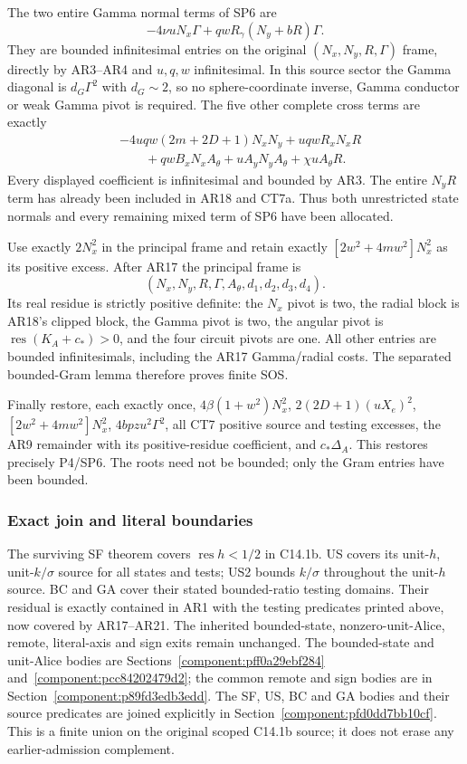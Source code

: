 The two entire Gamma normal terms of SP6 are
\[
 -4\nu uN_x\Gamma
          +qwR_\gamma(N_y+bR)\Gamma.
 \tag{AR19}
\]
They are bounded infinitesimal entries on the original
$(N_x,N_y,R,\Gamma)$ frame, directly by AR3--AR4 and
$u,q,w$ infinitesimal. In this source sector the Gamma diagonal
is $d_G\Gamma^2$ with $d_G\sim2$, so no sphere-coordinate
inverse, Gamma conductor or weak Gamma pivot is required.
The five other complete cross terms are exactly
\[
 \begin{split}
 &-4uqw(2m+2D+1)N_xN_y+uqwR_xN_xR\\
 &\qquad+qwB_xN_xA_\theta+uA_yN_yA_\theta
                                      +\chi uA_\theta R.
 \end{split} \tag{AR20}
\]
Every displayed coefficient is infinitesimal and bounded by
AR3. The entire $N_yR$ term has already been included in
AR18 and CT7a. Thus both unrestricted state normals and every
remaining mixed term of SP6 have been allocated.

Use exactly $2N_x^2$ in the principal frame and retain exactly
$[2w^2+4mw^2]N_x^2$ as its positive excess. After AR17 the
principal frame is
\[
          (N_x,N_y,R,\Gamma,A_\theta,d_1,d_2,d_3,d_4).
 \tag{AR21}
\]
Its real residue is strictly positive definite: the $N_x$ pivot
is two, the radial block is AR18's clipped block, the Gamma
pivot is two, the angular pivot is $\operatorname{res}(K_A+c_*)>0$,
and the four circuit pivots are one. All other entries are
bounded infinitesimals, including the AR17 Gamma/radial costs.
The separated bounded-Gram lemma therefore proves finite SOS.

Finally restore, each exactly once, $4\beta(1+w^2)N_x^2$,
$2(2D+1)(uX_e)^2$, $[2w^2+4mw^2]N_x^2$,
$4bpzu^2\Gamma^2$, all CT7 positive source and testing
excesses, the AR9 remainder with its positive-residue coefficient,
and $c_*\Delta_A$. This restores precisely P4/SP6. The roots
need not be bounded; only the Gram entries have been bounded.

\subsubsection*{Exact join and literal boundaries}

The surviving SF theorem covers $\operatorname{res}h<1/2$ in
C14.1b. US covers its unit-$h$, unit-$k/\sigma$ source for
all states and tests; US2 bounds $k/\sigma$ throughout the
unit-$h$ source. BC and GA cover their stated bounded-ratio
testing domains. Their residual is exactly contained in AR1
with the testing predicates printed above, now covered by
AR17--AR21. The inherited bounded-state, nonzero-unit-Alice,
remote, literal-axis and sign exits remain unchanged. The bounded-state and unit-Alice bodies are Sections~\ref{component:pff0a29ebf284} and~\ref{component:pcc84202479d2}; the common remote and sign bodies are in Section~\ref{component:p89fd3edb3edd}. The SF, US, BC and GA bodies and their source predicates are joined explicitly in Section~\ref{component:pfd0dd7bb10cf}.
This is a finite union on the original scoped C14.1b source;
it does not erase any earlier-admission complement.

